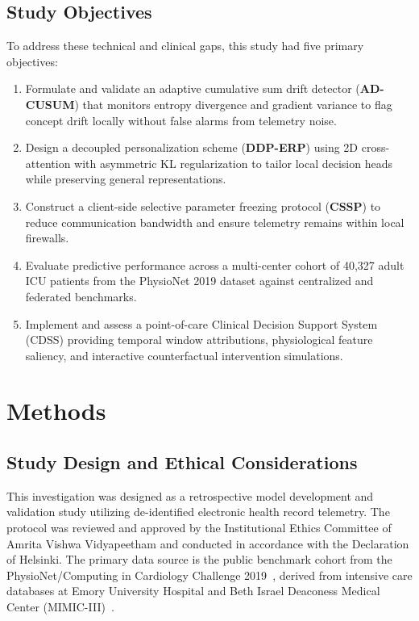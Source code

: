 \documentclass[11pt,a4paper]{article}
\begin{document}
\subsection{Study Objectives}
To address these technical and clinical gaps, this study had five primary objectives:
\begin{enumerate}[leftmargin=*]
    \item Formulate and validate an adaptive cumulative sum drift detector (\textbf{AD-CUSUM}) that monitors entropy divergence and gradient variance to flag concept drift locally without false alarms from telemetry noise.
    \item Design a decoupled personalization scheme (\textbf{DDP-ERP}) using 2D cross-attention with asymmetric KL regularization to tailor local decision heads while preserving general representations.
    \item Construct a client-side selective parameter freezing protocol (\textbf{CSSP}) to reduce communication bandwidth and ensure telemetry remains within local firewalls.
    \item Evaluate predictive performance across a multi-center cohort of 40,327 adult ICU patients from the PhysioNet 2019 dataset against centralized and federated benchmarks.
    \item Implement and assess a point-of-care Clinical Decision Support System (CDSS) providing temporal window attributions, physiological feature saliency, and interactive counterfactual intervention simulations.
\end{enumerate}

\FloatBarrier

\section{Methods}

\subsection{Study Design and Ethical Considerations}
This investigation was designed as a retrospective model development and validation study utilizing de-identified electronic health record telemetry. The protocol was reviewed and approved by the Institutional Ethics Committee of Amrita Vishwa Vidyapeetham and conducted in accordance with the Declaration of Helsinki. The primary data source is the public benchmark cohort from the PhysioNet/Computing in Cardiology Challenge 2019~\cite{reyna2020physionet}, derived from intensive care databases at Emory University Hospital and Beth Israel Deaconess Medical Center (MIMIC-III)~\cite{johnson2016mimic}.
\end{document}

